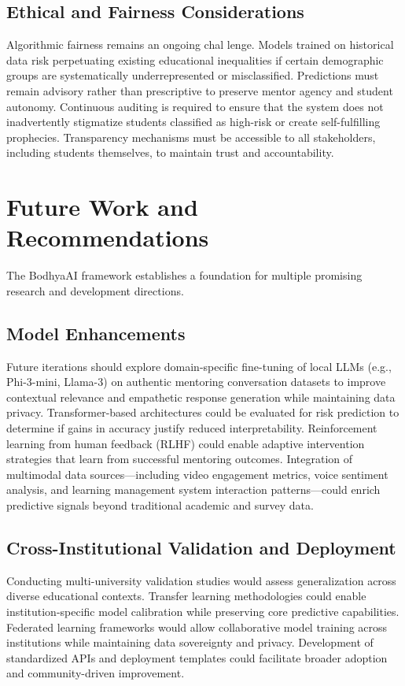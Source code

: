 \documentclass[conference]{IEEEtran}
\begin{document}
\subsection{Ethical and Fairness Considerations}
Algorithmic fairness remains an ongoing chal lenge. Models trained on historical data risk perpetuating existing educational inequalities if certain demographic groups are systematically underrepresented or misclassified. Predictions must remain advisory rather than prescriptive to preserve mentor agency and student autonomy. Continuous auditing is required to ensure that the system does not inadvertently stigmatize students classified as high-risk or create self-fulfilling prophecies. Transparency mechanisms must be accessible to all stakeholders, including students themselves, to maintain trust and accountability.

\section{Future Work and Recommendations}

The BodhyaAI framework establishes a foundation for multiple promising research and development directions.

\subsection{Model Enhancements}
Future iterations should explore domain-specific fine-tuning of local LLMs (e.g., Phi-3-mini, Llama-3) on authentic mentoring conversation datasets to improve contextual relevance and empathetic response generation while maintaining data privacy. Transformer-based architectures could be evaluated for risk prediction to determine if gains in accuracy justify reduced interpretability. Reinforcement learning from human feedback (RLHF) could enable adaptive intervention strategies that learn from successful mentoring outcomes. Integration of multimodal data sources—including video engagement metrics, voice sentiment analysis, and learning management system interaction patterns—could enrich predictive signals beyond traditional academic and survey data.

\subsection{Cross-Institutional Validation and Deployment}
Conducting multi-university validation studies would assess generalization across diverse educational contexts. Transfer learning methodologies could enable institution-specific model calibration while preserving core predictive capabilities. Federated learning frameworks would allow collaborative model training across institutions while maintaining data sovereignty and privacy. Development of standardized APIs and deployment templates could facilitate broader adoption and community-driven improvement.
\end{document}
